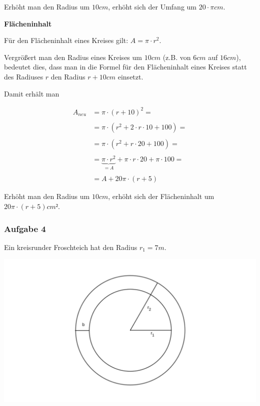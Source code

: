 \documentclass[
  ngerman,
]{book}
\begin{document}
Erhöht man den Radius um \(10cm\), erhöht sich der Umfang um \(20 \cdot \pi cm\).

\textbf{Flächeninhalt}

Für den Flächeninhalt eines Kreises gilt: \(A= \pi \cdot r^2\).

Vergrößert man den Radius eines Kreises um \(10cm\) (z.B. von \(6cm\) auf \(16cm\)), bedeutet dies, dass man in die Formel für den Flächeninhalt eines Kreises statt des Radiuses \(r\) den Radius \(r+10cm\) einsetzt.

Damit erhält man

\[ \begin{align} A_{neu} &= \pi \cdot (r+10)^2 =\\
{}\\
                         &= \pi \cdot (r^2+2\cdot r \cdot 10 + 100) =\\
                         {}\\
                         &= \pi \cdot (r^2+ r \cdot  20 + 100) =\\
                         {}\\
                         &= \underbrace{\pi \cdot r^2}_{=A} + \pi \cdot r \cdot 20 + \pi \cdot 100 =\\
                         {}\\
                         &= A + 20 \pi \cdot (r+5) \end{align}\]

Erhöht man den Radius um \(10cm\), erhöht sich der Flächeninhalt um \(20 \pi \cdot (r+5)cm²\).

\hypertarget{section-39}{%
\subsubsection*{}\label{section-39}}

\hypertarget{aufgabe-4-5}{%
\subsubsection*{Aufgabe 4}\label{aufgabe-4-5}}

Ein kreisrunder Froschteich hat den Radius \(r_1=7m\).

\includegraphics{./Bilder/WegUmTeich.png}
\end{document}
